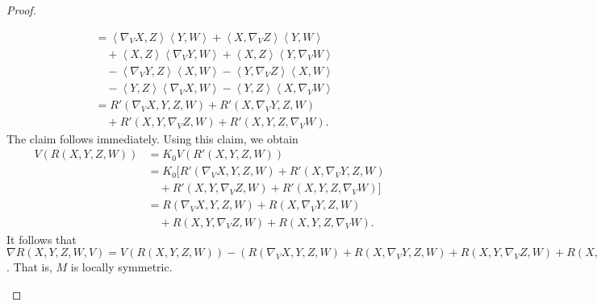 \documentclass[12pt]{article}
\begin{document}
\begin{proof}
\begin{enumerate}[label=(\alph*)]
\begin{align*}
		      &= \left\langle \nabla_VX,Z \right\rangle \left\langle Y,W \right\rangle+ \left\langle X, \nabla_VZ \right\rangle  \left\langle Y,W \right\rangle \\
		      & \quad + \left\langle X,Z \right\rangle  \left\langle \nabla_VY,W \right\rangle + \left\langle X,Z \right\rangle\left\langle Y,\nabla_VW \right\rangle  \\
		      & \quad - \left\langle \nabla_VY,Z \right\rangle \left\langle X,W \right\rangle - \left\langle Y,\nabla_VZ \right\rangle\left\langle X,W \right\rangle \\
		      &\quad - \left\langle Y,Z \right\rangle\left\langle \nabla_VX,W \right\rangle - \left\langle Y,Z \right\rangle \left\langle X,\nabla_VW \right\rangle  \\
	&= R'(\nabla_V X,Y,Z,W) + R'(X,\nabla_VY,Z,W) \\
	&\quad + R'(X,Y,\nabla_VZ,W) + R'(X,Y,Z,\nabla_VW)   .
\end{align*}
The claim follows immediately. Using this claim, we obtain
\begin{align*}
	V(R(X,Y,Z,W)) &= K_0 V(R'(X,Y,Z,W)) \\
	&= K_0[ R'(\nabla_V X,Y,Z,W) + R'(X,\nabla_VY,Z,W) \\
	&\quad + R'(X,Y,\nabla_VZ,W) + R'(X,Y,Z,\nabla_VW) ] \\
	&= R(\nabla_V X,Y,Z,W) + R(X,\nabla_VY,Z,W) \\
	&\quad + R(X,Y,\nabla_VZ,W) + R(X,Y,Z,\nabla_VW)  .
\end{align*}
It follows that $ \nabla R(X,Y,Z,W,V) = V(R(X,Y,Z,W)) - (R(\nabla_V X,Y,Z,W) + R(X,\nabla_VY,Z,W)+ R(X,Y,\nabla_VZ,W) + R(X,Y,Z,\nabla_VW)) =0  $. That is, $ M$ is locally symmetric.
\end{enumerate}
\end{proof}
\end{document}
